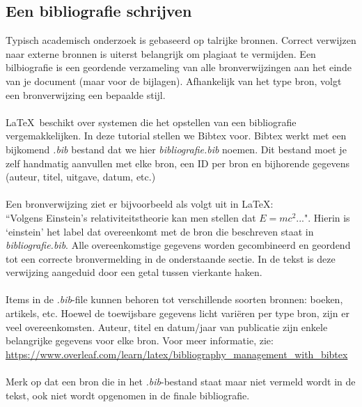 \subsection{Een bibliografie schrijven}
Typisch academisch onderzoek is gebaseerd op talrijke bronnen. Correct verwijzen naar externe bronnen is uiterst belangrijk om plagiaat te vermijden. Een bilbiografie is een geordende verzameling van alle bronverwijzingen aan het einde van je document (maar voor de bijlagen). Afhankelijk van het type bron, volgt een bronverwijzing een bepaalde stijl.
\\ \\
\LaTeX\ beschikt over systemen die het opstellen van een bibliografie vergemakkelijken. In deze tutorial stellen we Bibtex voor. Bibtex werkt met een bijkomend \textit{.bib} bestand dat we hier \textit{bibliografie.bib} noemen. Dit bestand moet je zelf handmatig aanvullen met elke bron, een ID per bron en bijhorende gegevens (auteur, titel, uitgave, datum, etc.)
\\ \\
Een bronverwijzing ziet er bijvoorbeeld als volgt uit in \LaTeX: \\
``Volgens Einstein's relativiteitstheorie \cite{einstein} kan men stellen dat $E = mc^2$...".  Hierin is `einstein' het label dat overeenkomt met de bron die beschreven staat in \textit{bibliografie.bib}. Alle overeenkomstige gegevens worden gecombineerd en geordend tot een correcte bronvermelding in de onderstaande sectie. In de tekst is deze verwijzing aangeduid door een getal tussen vierkante haken.
\\ \\
Items in de \textit{.bib}-file kunnen behoren tot verschillende soorten bronnen: boeken, artikels, etc. Hoewel de toewijsbare gegevens licht variëren per type bron, zijn er veel overeenkomsten. Auteur, titel en datum/jaar van publicatie zijn enkele belangrijke gegevens voor elke bron. Voor meer informatie, zie:  \url{https://www.overleaf.com/learn/latex/bibliography_management_with_bibtex}
\\ \\
Merk op dat een bron die in het \textit{.bib}-bestand staat maar niet vermeld wordt in de tekst, ook niet wordt opgenomen in de finale bibliografie.

\newpage
\setcounter{page}{1}

